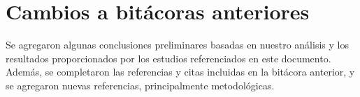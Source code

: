 \documentclass{book}
\begin{document}
\section{Cambios a bitácoras anteriores}
Se agregaron algunas conclusiones preliminares basadas en nuestro análisis y los resultados proporcionados por los estudios referenciados en este documento. Además, se completaron las referencias y citas incluidas en la bitácora anterior, y se agregaron nuevas referencias, principalmente metodológicas.




\nocite{*}
\end{document}
